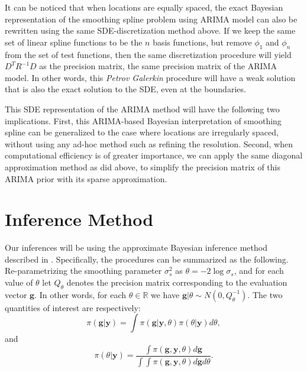 \documentclass{article}
\begin{document}
It can be noticed that when locations are equally spaced, the exact Bayesian representation of the smoothing spline problem using ARIMA model can also be rewritten using the same SDE-discretization method above. If we keep the same set of linear spline functions to be the $n$ basis functions, but remove $\phi_1$ and $\phi_n$ from the set of test functions, then the same discretization procedure will yield $D^TR^{-1}D$ as the precision matrix, the same precision matrix of the ARIMA model. In other words, this \textit{Petrov Galerkin} procedure will have a weak solution that is also the exact solution to the SDE, even at the boundaries.

This SDE representation of the ARIMA method will have the following two implications. First, this ARIMA-based Bayesian interpretation of smoothing spline can be generalized to the case where locations are irregularly spaced, without using any ad-hoc method such as refining the resolution. Second, when computational efficiency is of greater importance, we can apply the same diagonal approximation method as \citep{rw2} did above, to simplify the precision matrix of this ARIMA prior with its sparse approximation.

\section{Inference Method}\label{inference}

Our inferences will be using the approximate Bayesian inference method described in \cite{noeps}. Specifically, the procedures can be summarized as the following. Re-parametrizing the smoothing parameter $\sigma_s^2$ as $\theta = -2\log \sigma_s$, and for each value of $\theta$ let $Q_\theta$ denotes the precision matrix corresponding to the evaluation vector $\boldsymbol{g}$. In other words, for each $\theta \in \mathbb{R}$ we have $\boldsymbol{g}|\theta \sim N(0, Q_\theta^{-1})$. The two quantities of interest are respectively:
\begin{equation}\label{jointPoster}
\pi(\boldsymbol{g}|\boldsymbol{y}) = \int \pi(\boldsymbol{g}|\boldsymbol{y},\theta) \pi(\theta|\boldsymbol{y}) d\theta,
\end{equation}
and 
\begin{equation}\label{hyperPoster}
\pi(\theta|\boldsymbol{y}) = \frac{\int \pi(\boldsymbol{g}, \boldsymbol{y}, \theta) d\boldsymbol{g}} {\int \int \pi(\boldsymbol{g}, \boldsymbol{y}, \theta) d\boldsymbol{g} d\theta}.
\end{equation}
\end{document}
